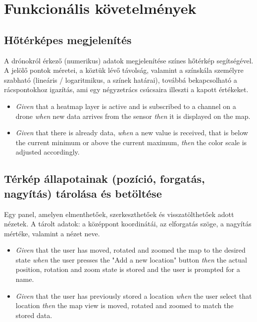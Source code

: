 \section{Funkcionális követelmények}

\subsection{Hőtérképes megjelenítés}

A drónokról érkező (numerikus) adatok megjelenítése színes hőtérkép segítségével.
A jelölő pontok méretei, a köztük lévő távolság, valamint a színskála személyre szabható (lineáris / logaritmikus, a színek határai), továbbá bekapcsolható a rácspontokhoz igazítás, ami egy négyzetrács csúcsaira illeszti a kapott értékeket.

\begin {itemize}
  \item \textit{Given} that a heatmap layer is active and is subscribed to a channel on a drone \textit{when} new data arrives from the sensor \textit{then} it is displayed on the map.
  \item \textit{Given} that there is already data, \textit{when} a new value is received, that is below the current minimum or above the current maximum, \textit{then} the color scale is adjusted accordingly.
\end {itemize}


\subsection{Térkép állapotainak (pozíció, forgatás, nagyítás) tárolása és betöltése}

Egy panel, amelyen elmenthetőek, szerkeszthetőek és visszatölthetőek adott nézetek. A tárolt adatok: a középpont koordinátái, az elforgatás szöge, a nagyítás mértéke, valamint a nézet neve.

\begin {itemize}
  \item \textit{Given} that the user has moved, rotated and zoomed the map to the desired state \textit{when} the user presses the "Add a new location" button \textit{then} the actual position, rotation and zoom state is stored and the user is prompted for a name.
  \item \textit{Given} that the user has previously stored a location \textit{when} the user select that location \textit{then} the map view is moved, rotated and zoomed to match the stored data.
\end {itemize}


